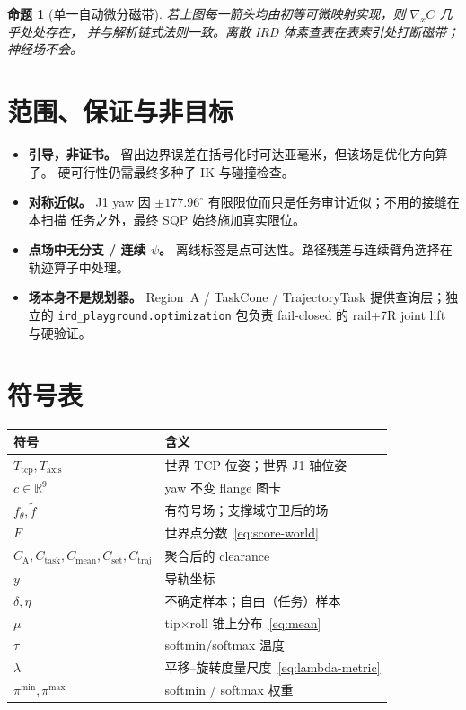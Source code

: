 \documentclass[UTF8,a4paper,11pt,fontset=fandol]{ctexart}
\newtheorem{proposition}{命题}
\newcommand{\R}{\mathbb{R}}
\newcommand{\Tcp}{T_{\mathrm{tcp}}}
\newcommand{\Taxis}{T_{\mathrm{axis}}}
\begin{document}
\begin{proposition}[单一自动微分磁带]
若上图每一箭头均由初等可微映射实现，则 \(\nabla_{x}C\) 几乎处处存在，
并与解析链式法则一致。离散 IRD 体素查表在表索引处打断磁带；神经场不会。
\end{proposition}

\section{范围、保证与非目标}
\label{sec:scope}

\begin{itemize}[leftmargin=1.4em]
  \item \textbf{引导，非证书。}
        留出边界误差在括号化时可达亚毫米，但该场是优化方向算子。
        硬可行性仍需最终多种子 IK 与碰撞检查。
  \item \textbf{对称近似。}
        J1 yaw 因 \(\pm177.96^\circ\) 有限限位而只是任务审计近似；不用的接缝在本扫描
        任务之外，最终 SQP 始终施加真实限位。
  \item \textbf{点场中无分支 / 连续 \(\psi\)。}
        离线标签是点可达性。路径残差与连续臂角选择在轨迹算子中处理。
  \item \textbf{场本身不是规划器。}
        Region~A / TaskCone / TrajectoryTask 提供查询层；独立的
        \texttt{ird\_playground.optimization} 包负责 fail-closed 的 rail+7R joint lift 与硬验证。
\end{itemize}

\section{符号表}
\label{sec:symbols}

\begin{center}
\begin{tabular}{@{}ll@{}}
\toprule
符号 & 含义 \\
\midrule
\(\Tcp,\Taxis\) & 世界 TCP 位姿；世界 J1 轴位姿 \\
\(c\in\R^{9}\) & yaw 不变 flange 图卡 \\
\(f_{\theta},\tilde f\) & 有符号场；支撑域守卫后的场 \\
\(F\) & 世界点分数~\eqref{eq:score-world} \\
\(C_{\mathrm{A}},C_{\mathrm{task}},C_{\mathrm{mean}},C_{\mathrm{set}},C_{\mathrm{traj}}\) &
  聚合后的 clearance \\
\(y\) & 导轨坐标 \\
\(\delta,\eta\) & 不确定样本；自由（任务）样本 \\
\(\mu\) & tip$\times$roll 锥上分布~\eqref{eq:mean} \\
\(\tau\) & softmin/softmax 温度 \\
\(\lambda\) & 平移--旋转度量尺度~\eqref{eq:lambda-metric} \\
\(\pi^{\mathrm{min}},\pi^{\mathrm{max}}\) & softmin / softmax 权重 \\
\bottomrule
\end{tabular}
\end{center}
\end{document}
